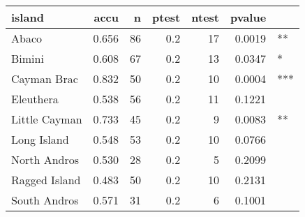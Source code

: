 
\begin{tabular}{l|r|r|r|r|r|l}
\hline
island & accu & n & ptest & ntest & pvalue & \\
\hline
Abaco & 0.656 & 86 & 0.2 & 17 & 0.0019 & **\\
\hline
Bimini & 0.608 & 67 & 0.2 & 13 & 0.0347 & *\\
\hline
Cayman Brac & 0.832 & 50 & 0.2 & 10 & 0.0004 & ***\\
\hline
Eleuthera & 0.538 & 56 & 0.2 & 11 & 0.1221 & \\
\hline
Little Cayman & 0.733 & 45 & 0.2 & 9 & 0.0083 & **\\
\hline
Long Island & 0.548 & 53 & 0.2 & 10 & 0.0766 & \\
\hline
North Andros & 0.530 & 28 & 0.2 & 5 & 0.2099 & \\
\hline
Ragged Island & 0.483 & 50 & 0.2 & 10 & 0.2131 & \\
\hline
South Andros & 0.571 & 31 & 0.2 & 6 & 0.1001 & \\
\hline
\end{tabular}
